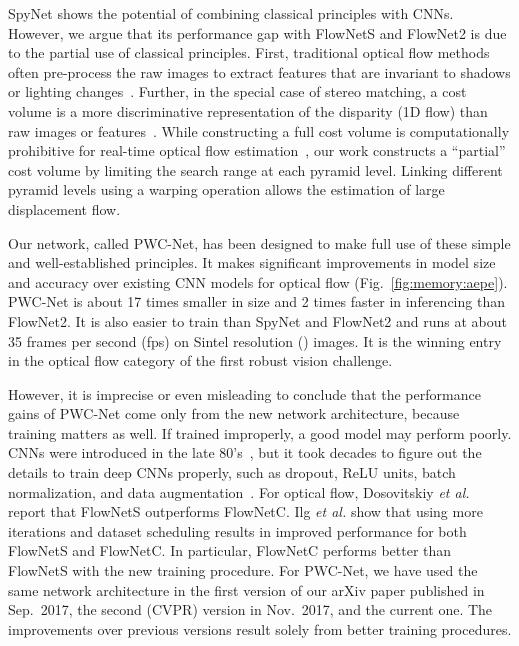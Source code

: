 \documentclass[10pt,journal,cspaper,compsoc]{IEEEtran}
\def\etal{\emph{et al.}\xspace}
\begin{document}
	
	SpyNet shows the potential of combining classical principles with CNNs. However, we argue that its performance gap with FlowNetS and FlowNet2 is due to the partial use of classical principles. First, traditional optical flow methods often pre-process the raw images to extract {features} that are invariant to shadows or lighting changes~\cite{Baker:2011:DEO,weber1995robust}.
	Further, in the special case of stereo matching, a cost volume is a more discriminative representation of the disparity (1D flow) than raw images or features~\cite{Hosni2013Fast,Scharstein:2002:TEDS,Zbontar2016Stereo}. While constructing a full cost volume is computationally prohibitive for real-time optical flow estimation~\cite{Xu2017Accurate}, our work constructs a ``partial''
	cost volume by limiting the search range at each pyramid level. Linking different pyramid levels using a warping operation allows the estimation of large displacement flow. 
	
	
	Our network, called PWC-Net, has been designed to make full use of these simple and well-established principles. It makes significant improvements in model size and accuracy over existing CNN models for optical flow (Fig.~\ref{fig:memory:aepe}). 
	PWC-Net is about 17 times smaller in size and 2 times faster in inferencing than FlowNet2. It is also easier to train than SpyNet and FlowNet2 and runs at about 35 frames per second (fps) on Sintel resolution () images. 
	It is the winning entry in the optical flow category of the first robust vision challenge. 

	
	However, it is imprecise or even misleading to conclude that the performance gains of PWC-Net come only from the new network architecture, because training matters as well.  If trained improperly, a good model may perform poorly. 
	CNNs were introduced in the late 80's~\cite{Lecun1989Backpropagation,Lecun1998Gradient}, but it took decades to figure out the details to train deep CNNs properly, such as dropout, ReLU units, batch normalization, and data augmentation~\cite{krizhevsky2012imagenet}. For optical flow, Dosovitskiy \etal \cite{Dosovitskiy:2015Flownet} report that FlowNetS outperforms FlowNetC. Ilg \etal \cite{Ilg:2016:Flownet2} show that using more iterations and dataset scheduling results in improved performance for both FlowNetS and FlowNetC. In particular, FlowNetC performs better than FlowNetS with the new training procedure. 
	For PWC-Net, we have used the same network architecture in the first version of our arXiv paper published in Sep.~2017, the second (CVPR) version in Nov.~2017, and the current one. The improvements over previous versions result solely from better training procedures. 
	
\end{document}
